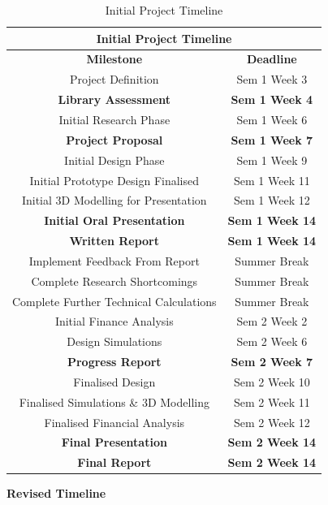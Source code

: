 \begin{table}[H]
	\centering
	\begin{tabular}{||c c||} 
		\hline
		\multicolumn{2}{|c|}{\textbf{Initial Project Timeline}} \\ [0.5ex] 
		\hline\hline
		\textbf{Milestone} & \textbf{Deadline} \\ 
		\hline\hline
		Project Definition 							& Sem 1 Week 3 \\ 
		\textbf{Library Assessment} 				& \textbf{Sem 1 Week 4} \\
		Initial Research Phase 						& Sem 1 Week 6 \\
		\textbf{Project Proposal} 					& \textbf{Sem 1 Week 7} \\
		Initial Design Phase 						& Sem 1 Week 9 \\
		Initial Prototype Design Finalised 			& Sem 1 Week 11 \\
		Initial 3D Modelling for Presentation 		& Sem 1 Week 12 \\
		\textbf{Initial Oral Presentation} 			& \textbf{Sem 1 Week 14} \\ 
		\textbf{Written Report} 					& \textbf{Sem 1 Week 14} \\ 
		Implement Feedback From Report 				& Summer Break \\
		Complete Research Shortcomings 				& Summer Break \\
		Complete Further Technical Calculations 	& Summer Break \\
		Initial Finance Analysis 					& Sem 2 Week 2 \\
		Design Simulations 							& Sem 2 Week 6 \\
		\textbf{Progress Report} 					& \textbf{Sem 2 Week 7} \\
		Finalised Design 							& Sem 2 Week 10 \\
		Finalised Simulations \& 3D Modelling 		& Sem 2 Week 11 \\
		Finalised Financial Analysis				& Sem 2 Week 12 \\
		\textbf{Final Presentation} 				& \textbf{Sem 2 Week 14} \\
		\textbf{Final Report} 						& \textbf{Sem 2 Week 14} \\ [1ex] 
		\hline
	\end{tabular}
	\caption{Initial Project Timeline}
	\label{table:timeline_original}
\end{table}    

\newpage
\textbf{Revised Timeline}

